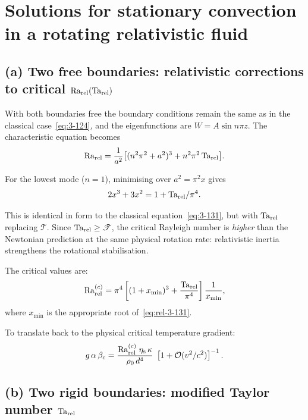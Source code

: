 \section{Solutions for stationary convection in a rotating relativistic fluid}
\label{sec:rel-3-27}

\subsection*{(a) Two free boundaries: relativistic corrections to critical $\mathrm{Ra}_{\mathrm{rel}}(\mathrm{Ta}_{\mathrm{rel}})$}

With both boundaries free the boundary conditions remain the same as in
the classical case~\eqref{eq:3-124}, and the eigenfunctions are
$W = A\sin n\pi z$.  The characteristic equation becomes
\begin{equation}\label{eq:rel-3-127}
  \mathrm{Ra}_{\mathrm{rel}}
  = \frac{1}{a^2}\bigl[(n^2\pi^2 + a^2)^3 + n^2\pi^2\,\mathrm{Ta}_{\mathrm{rel}}\bigr].
\end{equation}

For the lowest mode ($n=1$), minimising over $a^2 = \pi^2 x$ gives
\begin{equation}\label{eq:rel-3-131}
  2x^3 + 3x^2 = 1 + \mathrm{Ta}_{\mathrm{rel}}/\pi^4.
\end{equation}

This is identical in form to the classical equation~\eqref{eq:3-131},
but with $\mathrm{Ta}_{\mathrm{rel}}$ replacing $\mathscr{T}$.  Since $\mathrm{Ta}_{\mathrm{rel}} \geq
\mathscr{T}$, the critical Rayleigh number is \emph{higher} than the
Newtonian prediction at the same physical rotation rate: relativistic
inertia strengthens the rotational stabilisation.

The critical values are:
\begin{equation}\label{eq:rel-3-128}
  \mathrm{Ra}_{\mathrm{rel}}^{(c)}
  = \pi^4\left[(1+x_{\min})^3 + \frac{\mathrm{Ta}_{\mathrm{rel}}}{\pi^4}\right]
    \frac{1}{x_{\min}},
\end{equation}
where $x_{\min}$ is the appropriate root of~\eqref{eq:rel-3-131}.

To translate back to the physical critical temperature gradient:
\begin{equation}\label{eq:rel-beta-c}
  g\,\alpha\,\beta_c
  = \frac{\mathrm{Ra}_{\mathrm{rel}}^{(c)}\;\eta_{\mathrm{s}}\,\kappa}{\rho_0\,d^4}
    \;\left[1 + \mathcal{O}(v^2/c^2)\right]^{-1}.
\end{equation}

\subsection*{(b) Two rigid boundaries: modified Taylor number $\mathrm{Ta}_{\mathrm{rel}}$}

